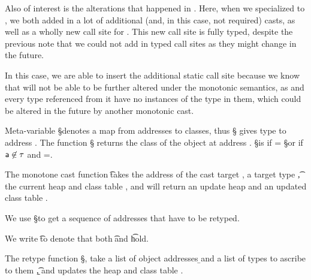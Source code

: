 \documentclass[a4paper,USenglish]{tex/lipics-v2016}
\begin{document}
Also of interest is the alterations that happened in . Here, when we 
specialized  to , we both added in a lot of additional (and, in this
case, not required) casts, as well as a wholly new call site for \m. This new
call site is fully typed, despite the previous note that we could not add in 
typed call sites as they might change in the future.

In this case, we are able to insert the additional static call site because we 
know that  will not be able to be further altered under the monotonic 
semantics, as  and every type referenced from it have no instances of the
type \any in them, which could be altered in the future by another monotonic
cast.

Meta-variable \S denotes a map from addresses to classes, thus
\Map\S{\Bind\a\C} gives type \C to address \a. The function \htype\a\S\s\K
returns the class of the object at address \a.  \htype\a\S\s\K is \C if \C =
\App\S\a or if $\a\not\in\S$ and \obj\C{\b\a}=\App\s\a.


The monotone cast function \moncast\a\t\s\K\Kp\sp takes the address of the
cast target \a, a target type \t, the current heap \s and class table \K, and
will return an update heap \sp and an updated class table \Kp.

We use \Dom\S to get a sequence of addresses that have to be retyped.

\begin{mathpar}
\end{mathpar}


We write \t\EQ\tp to denote that both \StrSub{}\K\t\tp and
\StrSub{}\K\tp\t hold.

The retype function \retype{\b\a}{\b\t}\S\s\K, take a list of object
addresses \b\a and a list of types to ascribe to them \b\t, and updates the
heap \s and class table \K.

\end{document}
